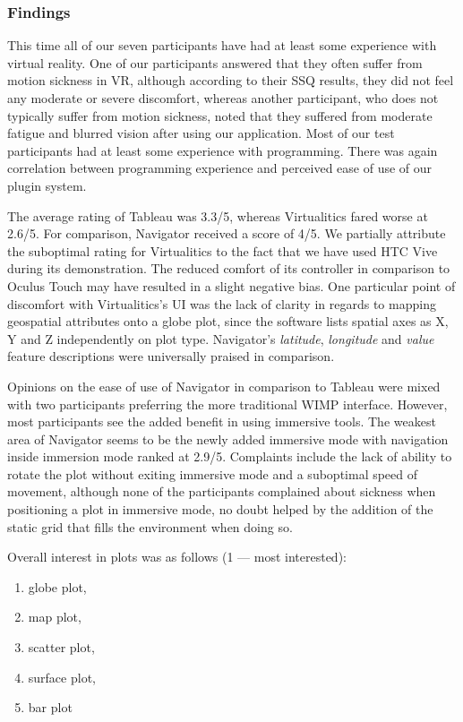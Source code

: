 \documentclass[thesis=M,english,hidelinks]{FITthesisXE}[2012/06/26]
\begin{document}
\subsubsection{Findings}

This time all of our seven participants have had at least some experience with virtual reality. One of our participants answered that they often suffer from motion sickness in VR, although according to their SSQ results, they did not feel any moderate or severe discomfort, whereas another participant, who does not typically suffer from motion sickness, noted that they suffered from moderate fatigue and blurred vision after using our application. Most of our test participants had at least some experience with programming. There was again correlation between programming experience and perceived ease of use of our plugin system.

The average rating of Tableau was 3.3/5, whereas Virtualitics fared worse at 2.6/5. For comparison, Navigator received a score of 4/5. We partially attribute the suboptimal rating for Virtualitics to the fact that we have used HTC Vive during its demonstration. The reduced comfort of its controller in comparison to Oculus Touch may have resulted in a slight negative bias. One particular point of discomfort with Virtualitics's UI was the lack of clarity in regards to mapping geospatial attributes onto a globe plot, since the software lists spatial axes as X, Y and Z independently on plot type. Navigator's \emph{latitude}, \emph{longitude} and \emph{value} feature descriptions were universally praised in comparison.

Opinions on the ease of use of Navigator in comparison to Tableau were mixed with two participants preferring the more traditional WIMP interface. However, most participants see the added benefit in using immersive tools. The weakest area of Navigator seems to be the newly added immersive mode with navigation inside immersion mode ranked at 2.9/5. Complaints include the lack of ability to rotate the plot without exiting immersive mode and a suboptimal speed of movement, although none of the participants complained about sickness when positioning a plot in immersive mode, no doubt helped by the addition of the static grid that fills the environment when doing so.

\newpage

Overall interest in plots was as follows (1 --- most interested):

\begin{enumerate}
\item globe plot,
\item map plot,
\item scatter plot,
\item surface plot,
\item bar plot
\end{enumerate}
\end{document}
